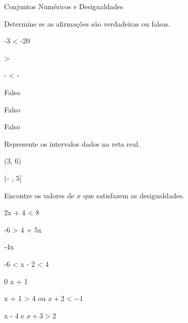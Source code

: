 
\begin{exercicios}{Conjuntos Numéricos e Desigualdades}
    
    \begin{exercicio}
        Determine se as afirmações são verdadeiras ou falsas.
        \begin{mathlist}[2]
            \item -3 < -20
            \item  {} >  
            \item - < -
        \end{mathlist}
        \begin{answers}
            \begin{alphalist}[3]
            \item Falso
            \item Falso
            \item Falso
        \end{alphalist}
        \end{answers}
    \end{exercicio}
        
    \begin{exercicio}
        Represente os intervalos dados na reta real.
        \begin{mathlist}[2]
            \item (3, 6)
            \item [-1, 4)
            \item \left[ - \frac{6}{5}, - \frac{1}{2} \right] 
            \item (- \infty, 5]
        \end{mathlist}
    \end{exercicio}
        
    \begin{exercicio}
        Encontre os valores de $x$ que satisfazem as desigualdades.
        \begin{mathlist}[2]
            \item 2x + 4 < 8
            \item -6 > 4 + 5x
            \item -4x 
            \item -6 < x - 2 < 4
            \item 0 \leq x + 1 
            \item x + 1 > 4 \) ou $x + 2 < -1$
            \item x - 4  \) e $x + 3 > 2$
        \end{mathlist}
    \end{exercicio}
    

\end{exercicios}
